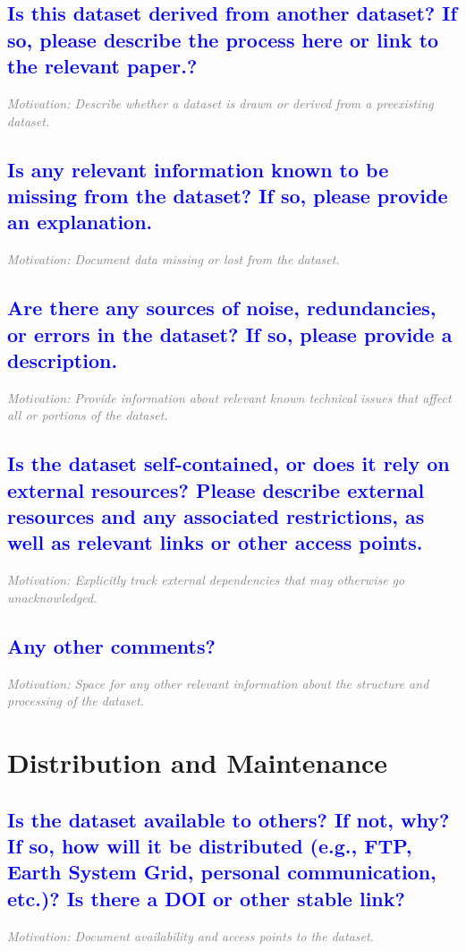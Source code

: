 \documentclass[letterpaper, 10 pt, transmag]{IEEEtran}
\begin{document}
\textcolor{blue}{\subsection{Is this dataset derived from another dataset? If so, please describe the process here or link to the relevant paper.?}} 
\textcolor{gray}{\textit{Motivation: Describe whether a dataset is drawn or derived from a preexisting dataset.}}

\textcolor{blue}{\subsection{Is any relevant information known to be missing from the dataset? If so, please provide an explanation.}}
\textcolor{gray}{\textit{Motivation: Document data missing or lost from the dataset.}}

\textcolor{blue}{\subsection{Are there any sources of noise, redundancies, or errors in the dataset? If so, please provide a description.}}
\textcolor{gray}{\textit{Motivation: Provide information about relevant known technical issues that affect all or portions of the dataset.}}

\textcolor{blue}{\subsection{Is the dataset self-contained, or does it rely on external resources? Please describe external resources and any associated restrictions, as well as relevant links or other access points.}}
\textcolor{gray}{\textit{Motivation: Explicitly track external dependencies that may otherwise go unacknowledged.}}

\textcolor{blue}{\subsection{Any other comments?}}
\textcolor{gray}{\textit{Motivation: Space for any other relevant information about the structure and processing of the dataset.}}  
\vspace{10mm}

\section{Distribution and Maintenance}

\textcolor{blue}{\subsection{Is the dataset available to others? If not, why? If so, how will it be distributed (e.g., FTP, Earth System Grid, personal communication, etc.)? Is there a DOI or other stable link?}}
\textcolor{gray}{\textit{Motivation: Document availability and access points to the dataset.}}
\end{document}
